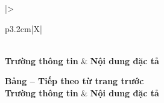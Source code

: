 \begingroup
\small
\renewcommand{\arraystretch}{1.2}
\begin{xltabular}{\textwidth}{|>{\bfseries\raggedright\arraybackslash}p{3.2cm}|X|}
\caption{Bảng đặc tả chi tiết Use Case UC05: Phát tín hiệu cảnh báo tại trạm} \label{tab:spec_uc05} \\
\hline
\textbf{Trường thông tin} & \textbf{Nội dung đặc tả} \\ \hline
\endfirsthead

{{\bfseries Bảng \thetable{} -- Tiếp theo từ trang trước}} \\
\hline
\textbf{Trường thông tin} & \textbf{Nội dung đặc tả} \\ \hline
\endhead

\hline {} \\ \hline
\endfoot


\end{xltabular}
